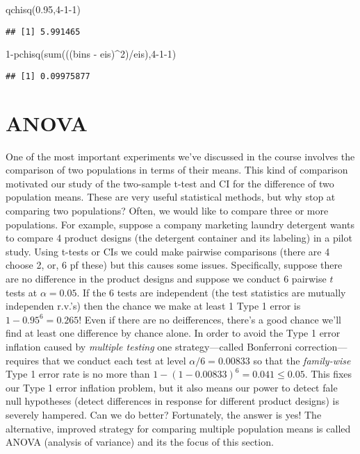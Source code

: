 \documentclass[
]{book}
\newenvironment{Shaded}{\begin{snugshade}}{\end{snugshade}}
\newcommand{\DecValTok}[1]{\textcolor[rgb]{0.00,0.00,0.81}{#1}}
\newcommand{\FloatTok}[1]{\textcolor[rgb]{0.00,0.00,0.81}{#1}}
\newcommand{\FunctionTok}[1]{\textcolor[rgb]{0.00,0.00,0.00}{#1}}
\newcommand{\NormalTok}[1]{#1}
\newcommand{\SpecialCharTok}[1]{\textcolor[rgb]{0.00,0.00,0.00}{#1}}
\begin{document}
\begin{Shaded}
\begin{Highlighting}[]
\FunctionTok{qchisq}\NormalTok{(}\FloatTok{0.95}\NormalTok{,}\DecValTok{4{-}1{-}1}\NormalTok{)}
\end{Highlighting}
\end{Shaded}

\begin{verbatim}
## [1] 5.991465
\end{verbatim}

\begin{Shaded}
\begin{Highlighting}[]
\DecValTok{1}\SpecialCharTok{{-}}\FunctionTok{pchisq}\NormalTok{(}\FunctionTok{sum}\NormalTok{(((bins }\SpecialCharTok{{-}}\NormalTok{ eis)}\SpecialCharTok{\^{}}\DecValTok{2}\NormalTok{)}\SpecialCharTok{/}\NormalTok{eis),}\DecValTok{4{-}1{-}1}\NormalTok{)}
\end{Highlighting}
\end{Shaded}

\begin{verbatim}
## [1] 0.09975877
\end{verbatim}

\hypertarget{anova}{%
\chapter{ANOVA}\label{anova}}

One of the most important experiments we've discussed in the course involves the comparison of two populations in terms of their means. This kind of comparison motivated our study of the two-sample t-test and CI for the difference of two population means. These are very useful statistical methods, but why stop at comparing two populations? Often, we would like to compare three or more populations. For example, suppose a company marketing laundry detergent wants to compare 4 product designs (the detergent container and its labeling) in a pilot study. Using t-tests or CIs we could make pairwise comparisons (there are 4 choose 2, or, 6 pf these) but this causes some issues. Specifically, suppose there are no difference in the product designs and suppose we conduct 6 pairwise \(t\) tests at \(\alpha = 0.05\). If the 6 tests are independent (the test statistics are mutually independen r.v.'s) then the chance we make at least 1 Type 1 error is \(1-0.95^6 = 0.265\)! Even if there are no deifferences, there's a good chance we'll find at least one difference by chance alone. In order to avoid the Type 1 error inflation caused by \emph{multiple testing} one strategy---called Bonferroni correction---requires that we conduct each test at level \(\alpha / 6 = 0.00833\) so that the \emph{family-wise} Type 1 error rate is no more than \(1-(1-0.00833)^6 = 0.041 \leq 0.05\). This fixes our Type 1 error inflation problem, but it also means our power to detect fale null hypotheses (detect differences in response for different product designs) is severely hampered. Can we do better? Fortunately, the answer is yes! The alternative, improved strategy for comparing multiple population means is called ANOVA (analysis of variance) and its the focus of this section.
\end{document}
